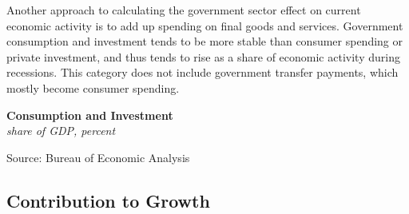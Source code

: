 \documentclass{report}
\makeatletter
\newcommand{\tbllink}[1]{\href{https://raw.githubusercontent.com/bdecon/US-chartbook/master/chartbook/data/#1}{\faTable}}
\newcommand*\short[1]{\expandafter\@gobbletwo\number\numexpr#1\relax}
\newcommand{\stdnode}[3]{\node[below, align=left, shift=({#1,#2})]{#3};}
\newcommand{\shdateaxisticks}{
		date coordinates in=x, axis line style={draw=none},
		xmax={2023-11-30},
		max space between ticks=40,	    
		xtick={{1990-01-01}, {1995-01-01}, {2000-01-01}, 
			{2005-01-01}, {2010-01-01}, {2015-01-01}, {2020-01-01}},
		minor xtick={},
		enlarge y limits={0.06}, enlarge x limits={0.01},
		xticklabel style={align=center, yshift=-2pt}, tick label style={inner sep=0pt},
		}
\newcommand{\bbar}[2]{extra #1 ticks = {{#2}}, extra #1 tick labels = ,
		extra #1 tick style = {grid=major, grid style={thick, black!25}},}
\newcommand{\stdline}[4]{\addplot[very thick, no markers, color=#1] 
		table [x=#2, y=#3, col sep=comma] {#4};	}
\newcommand{\rbars}{
		\fill[color=black!10] (axis cs:{1990-07-01},\pgfkeysvalueof{/pgfplots/ymin})
			rectangle (axis cs:{1991-03-01}, \pgfkeysvalueof{/pgfplots/ymax});
		\fill[color=black!10] (axis cs:{2007-12-01},\pgfkeysvalueof{/pgfplots/ymin})
			rectangle (axis cs:{2009-07-01}, \pgfkeysvalueof{/pgfplots/ymax});
		\fill[color=black!10] (axis cs:{2001-03-01},\pgfkeysvalueof{/pgfplots/ymin})
			rectangle (axis cs:{2001-11-01}, \pgfkeysvalueof{/pgfplots/ymax});
		\fill[color=black!10] (axis cs:{2020-02-01},\pgfkeysvalueof{/pgfplots/ymin})
			rectangle (axis cs:{2020-05-01}, \pgfkeysvalueof{/pgfplots/ymax});}
\makeatother
\begin{document}
{\begin{minipage}{0.76\textwidth}
\small Another approach to calculating the government sector effect on current economic activity is to add up spending on final goods and services. Government consumption and investment tends to be more stable than consumer spending or private investment, and thus tends to rise as a share of economic activity during recessions. This category does not include government transfer payments, which mostly become consumer spending.
\end{minipage}
\vspace{1mm}

\begin{minipage}{0.38\textwidth}
\normalsize \textbf{Consumption and Investment}\\
\footnotesize{\textit{share of GDP, percent}}
\vspace{3.7cm}

\hspace{2mm} 

\footnotesize{Source: Bureau of Economic Analysis} \hfill \tbllink{govci.csv}
\end{minipage}\hspace{5mm}
\begin{minipage}{0.34\textwidth}
\small 
\end{minipage}
\newpage
\hypertarget{govco}{\label{govco}}  
\begin{minipage}{0.76\textwidth}   
\subsection*{Contribution to Growth}
\small   
\vspace{2mm}


\end{minipage}}
\end{document}
